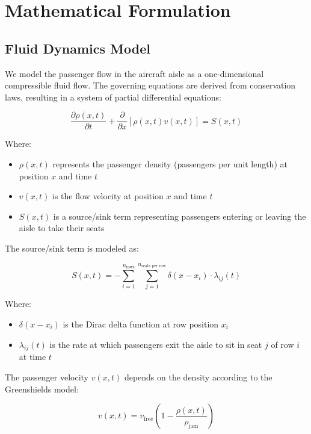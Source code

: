 \documentclass[a4paper,12pt]{article}
\begin{document}
\section{Mathematical Formulation}

\subsection{Fluid Dynamics Model}

We model the passenger flow in the aircraft aisle as a one-dimensional compressible fluid flow. The governing equations are derived from conservation laws, resulting in a system of partial differential equations:

\begin{equation}
\frac{\partial \rho(x,t)}{\partial t} + \frac{\partial}{\partial x}[\rho(x,t)v(x,t)] = S(x,t)
\end{equation}

Where:
\begin{itemize}
    \item $\rho(x,t)$ represents the passenger density (passengers per unit length) at position $x$ and time $t$
    \item $v(x,t)$ is the flow velocity at position $x$ and time $t$
    \item $S(x,t)$ is a source/sink term representing passengers entering or leaving the aisle to take their seats
\end{itemize}

The source/sink term is modeled as:

\begin{equation}
S(x,t) = -\sum_{i=1}^{n_{\text{rows}}} \sum_{j=1}^{n_{\text{seats per row}}} \delta(x - x_i) \cdot \lambda_{ij}(t)
\end{equation}

Where:
\begin{itemize}
    \item $\delta(x - x_i)$ is the Dirac delta function at row position $x_i$
    \item $\lambda_{ij}(t)$ is the rate at which passengers exit the aisle to sit in seat $j$ of row $i$ at time $t$
\end{itemize}

The passenger velocity $v(x,t)$ depends on the density according to the Greenshields model:

\begin{equation}
v(x,t) = v_{\text{free}} \left(1 - \frac{\rho(x,t)}{\rho_{\text{jam}}}\right)
\end{equation}
\end{document}
